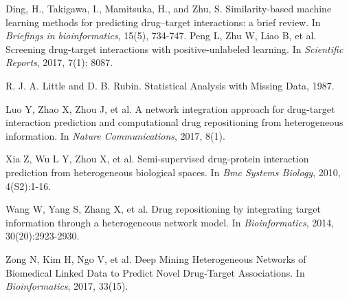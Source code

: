 \documentclass[sigconf,anonymous]{acmart}
\begin{document}
\begin{thebibliography}{10}
Ding, H., Takigawa, I., Mamitsuka, H., and Zhu, S.
\newblock Similarity-based machine learning methods for predicting drug–target interactions: a brief review. \newblock In {\em Briefings in bioinformatics}, 15(5), 734-747.
Peng L, Zhu W, Liao B, et al.
\newblock Screening drug-target interactions with positive-unlabeled learning.
\newblock In {\em Scientific Reports}, 2017, 7(1): 8087.

R. J. A. Little and D. B. Rubin.
\newblock Statistical Analysis with Missing Data, 1987.

Luo Y, Zhao X, Zhou J, et al.
\newblock A network integration approach for drug-target interaction prediction and computational drug repositioning from heterogeneous information.
\newblock In {\em Nature Communications}, 2017, 8(1).

Xia Z, Wu L Y, Zhou X, et al. 
\newblock Semi-supervised drug-protein interaction prediction from heterogeneous biological spaces. 
\newblock In {\em Bmc Systems Biology}, 2010, 4(S2):1-16.

Wang W, Yang S, Zhang X, et al. 
\newblock Drug repositioning by integrating target information through a heterogeneous network model. 
\newblock In {\em Bioinformatics}, 2014, 30(20):2923-2930.

Zong N, Kim H, Ngo V, et al. 
\newblock Deep Mining Heterogeneous Networks of Biomedical Linked Data to Predict Novel Drug-Target Associations. 
\newblock In {\em Bioinformatics}, 2017, 33(15).

%
%
%
\end{thebibliography}
\end{document}

